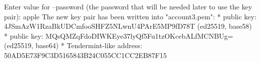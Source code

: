 \begin{shellbox}\begin{ttlst}
Enter value for --password (the password that will be needed later to use the key pair): apple
The new key pair has been written into "account3.pem":
* public key: 4JSmAzW1RzaBkUDCmfooSHFZ5NLwnU4PArE5MP9fD78T (ed25519, base58)
* public key: MQsQMZqFdoDIWKEye37lyQf5Fu1tzOKcebALfMCNBUg= (ed25519, base64)
* Tendermint-like address: 50AD5E73F9C3D5165843B24C055CC1CC2EB87F15
\end{ttlst}\end{shellbox}
